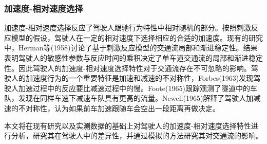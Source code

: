 

\subsubsection{加速度-相对速度选择}
加速度-相对速度选择反应了驾驶人跟驰行为特性中相对随机的部分。按照刺激反应模型的假设，驾驶人在一定的相对速度下选择相应的合适的加速度。现有的研究中，Herman等(1958)讨论了基于刺激反应模型的交通流局部和渐进稳定性\cite{Herman1959}。结果表明驾驶人的敏感性参数与反应时间的乘积决定了单车道交通流的局部和渐进稳定性。因此驾驶人的加速度-相对速度选择特性对于交通流存在不可忽略的影响。驾驶人的加速度行为的一个重要特征是加速和减速的不对称性，Forbes(1963)发现驾驶人加速过程中的反应要比减速过程中的慢\cite{Forbes1963}。Foote(1965)跟踪观测了隧道中的车队，发现在同样车速下减速车队具有更高的流量\cite{Foote1965}。Newell(1965)解释了驾驶人加减速的不对称性，认为如果前车加速跟随车会空出一段距离再做决定\cite{Newell1965}。


本文将在现有研究以及实测数据的基础上对驾驶人的加速度-相对速度选择特性进行分析，研究其在驾驶人中的差异性，并通过模拟的方法研究其对交通流的影响。

%
%
%
%
%
%
%



